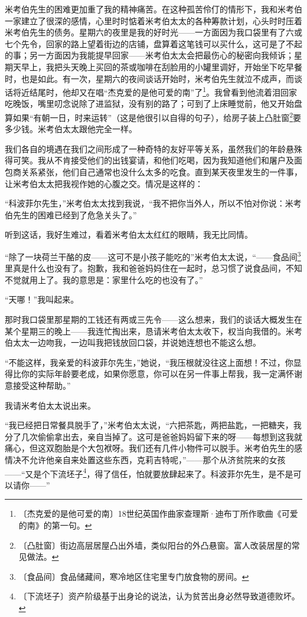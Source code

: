 \documentclass[12pt,UTF-8,openany]{ctexbook}
\begin{document}
\begin{normalsize}
    米考伯先生的困难更加重了我的精神痛苦。在这种孤苦伶仃的情形下，我和米考伯一家建立了很深的感情，心里时时惦着米考伯太太的各种筹款计划，心头时时压着米考伯先生的债务。星期六的夜里是我的好时光——一方面因为我口袋里有了六或七个先令，回家的路上望着街边的店铺，盘算着这笔钱可以买什么，这可是了不起的事；另一方面因为我能提早回家——米考伯太太会把最伤心的秘密向我倾诉；星期天早上，我把头天晚上买回的茶或咖啡在刮脸用的小罐里调好，开始坐下吃早餐时，也是如此。有一次，星期六的夜间谈话开始时，米考伯先生就泣不成声，而谈话将近结尾时，他却又在唱“杰克爱的是他可爱的南”了\footnote{〔杰克爱的是他可爱的南〕18世纪英国作曲家查理斯·迪布丁所作歌曲《可爱的南》的第一句。}。我曾看到他流着泪回家吃晚饭，嘴里叨念说除了进监狱，没有别的路了；可到了上床睡觉前，他又开始盘算如果“有朝一日，时来运转”（这是他很引以自得的句子），给房子装上凸肚窗\footnote{〔凸肚窗〕街边高层居屋凸出外墙，类似阳台的外凸悬窗。富人改装居屋的常见做法。}要多少钱。米考伯太太跟他完全一样。
    
    我们各自的境遇在我们之间形成了一种奇特的友好平等关系，虽然我们的年龄悬殊得可笑。我从不肯接受他们的出钱宴请，和他们吃喝，因为我知道他们和屠户及面包商关系紧张，他们自己通常也没什么太多的吃食。直到某天夜里发生的一件事，让米考伯太太把我视作她的心腹之交。情况是这样的：
    
    “科波菲尔先生，”米考伯太太找到我说，“我不把你当外人，所以不怕对你说：米考伯先生的困难已经到了危急关头了。”
    
    听到这话，我好生难过，看着米考伯太太红红的眼睛，我无比同情。
    
    “除了一块荷兰干酪的皮——这可不是小孩子能吃的”米考伯太太说，“——食品间\footnote{〔食品间〕食品储藏间，寒冷地区住宅里专门放食物的房间。}里真是什么也没有了。抱歉，我和爸爸妈妈住在一起时，总习惯了说食品间，不知不觉就用上了。我的意思是：家里什么吃的也没有了。”
    
    “天哪！”我叫起来。
    
    那时我口袋里那星期的工钱还有两或三先令——这么想来，我们的谈话大概发生在某个星期三的晚上——我连忙掏出来，恳请米考伯太太收下，权当向我借的。米考伯太太一边吻我，一边叫我把钱放回口袋，并说她连想也不能这么想。
    
    “不能这样，我亲爱的科波菲尔先生，”她说，“我压根就没往这上面想！不过，你显得比你的实际年龄要老成，如果你愿意，你可以在另一件事上帮我，我一定满怀谢意接受这种帮助。”
    
    我请米考伯太太说出来。
    
    “我已经把日常餐具脱手了，”米考伯太太说，“六把茶匙，两把盐匙，一把糖夹，我分了几次偷偷拿出去，亲自当掉了。这可是爸爸妈妈留下来的呀——每想到这我就痛心，但这双胞胎是个大包袱呀。我们还有几件小物件可以脱手。米考伯先生的感情决不允许他亲自来处置这些东西，克莉吉特呢，”——那个从济贫院来的女孩——“又是个下流坯子\footnote{〔下流坯子〕资产阶级基于出身论的说法，认为贫苦出身必然导致道德败坏。}，得了信任，怕就要放肆起来了。科波菲尔先生，是不是可以请你——”
    

\end{normalsize}
\end{document}
